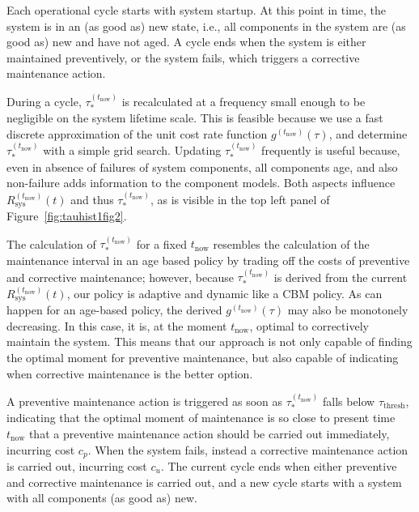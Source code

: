 \documentclass[authoryear]{elsarticle}
\def\yknow{y_k^{(\tnow)}}
\def\nknow{n_k^{(\tnow)}}
\def\tnow{t_\text{now}}
\def\tpnow{t^+_\text{now}}
\newcommand{\Rsysnow}{R^{(t_\text{now})}_\text{sys}}
\newcommand{\gnow}{g^{(\tnow)}}
\newcommand{\tausnow}{\tau_*^{(\tnow)}}
\newcommand{\tthresh}{\tau_{\text{thresh}}}
\begin{document}
Each operational cycle starts with system startup.
At this point in time, the system is in an (as good as) new state,
i.e., all components in the system are (as good as) new and have not aged.
A cycle ends when the system is either maintained preventively, %
or the system fails, which triggers a corrective maintenance action.

During a cycle,
$\tausnow$ is recalculated at a frequency small enough to be negligible on the system lifetime scale.
This is feasible because we use a fast discrete approximation of the unit cost rate function $\gnow(\tau)$,
and determine $\tausnow$ with a simple grid search.
Updating $\tausnow$ frequently is useful because,
even in absence of failures of system components,
all components age, and also non-failure adds information to the component models.
Both aspects influence $\Rsysnow(t)$ and thus $\tausnow$,
as is visible in the top left panel of Figure~\ref{fig:tauhist1fig2}.

The calculation of $\tausnow$ for a fixed $\tnow$ resembles the calculation
of the maintenance interval in an age based policy by trading off the costs of preventive and corrective maintenance;
however, because $\tausnow$ is derived from the current $\Rsysnow(t)$,
our policy is adaptive and dynamic like a CBM policy. 
As can happen for an age-based policy, the derived $\gnow(\tau)$ may also be monotonely decreasing.
In this case, it is, at the moment $\tnow$, optimal to correctively maintain the system.
This means that our approach is not only capable of finding the optimal moment for preventive maintenance,
but also capable of indicating when corrective maintenance is the better option.

A preventive maintenance action is triggered as soon as $\tausnow$ falls below $\tthresh$,
indicating that the optimal moment of maintenance is so close to present time $\tnow$
that a preventive maintenance action should be carried out immediately, incurring cost $c_p$.
When the system fails, instead a corrective maintenance action is carried out, incurring cost $c_u$.
The current cycle ends when either preventive and corrective maintenance is carried out,
and a new cycle starts with a system with all components (as good as) new.
\end{document}
